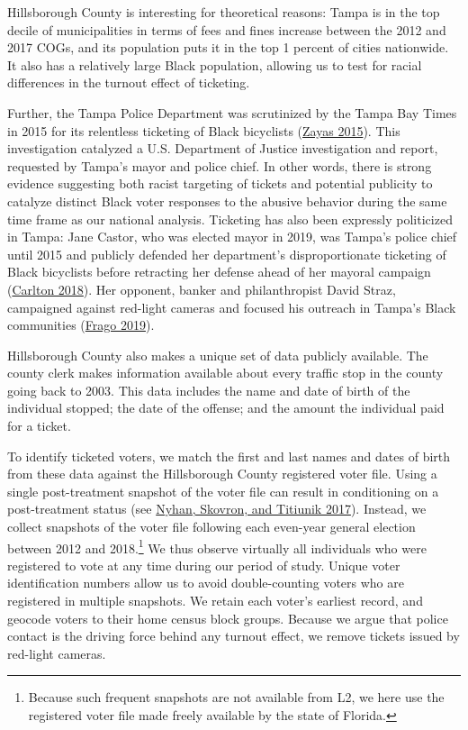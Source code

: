 \documentclass[
  12pt,
]{article}
\begin{document}
Hillsborough County is interesting for theoretical reasons: Tampa is in the top decile of municipalities in terms of fees and fines increase between the 2012 and 2017 COGs, and its population puts it in the top 1 percent of cities nationwide. It also has a relatively large Black population, allowing us to test for racial differences in the turnout effect of ticketing.

Further, the Tampa Police Department was scrutinized by the Tampa Bay Times in 2015 for its relentless ticketing of Black bicyclists (\protect\hyperlink{ref-Zayas2015}{Zayas 2015}). This investigation catalyzed a U.S. Department of Justice investigation and report, requested by Tampa's mayor and police chief. In other words, there is strong evidence suggesting both racist targeting of tickets and potential publicity to catalyze distinct Black voter responses to the abusive behavior during the same time frame as our national analysis. Ticketing has also been expressly politicized in Tampa: Jane Castor, who was elected mayor in 2019, was Tampa's police chief until 2015 and publicly defended her department's disproportionate ticketing of Black bicyclists before retracting her defense ahead of her mayoral campaign (\protect\hyperlink{ref-Carlton2018}{Carlton 2018}). Her opponent, banker and philanthropist David Straz, campaigned against red-light cameras and focused his outreach in Tampa's Black communities (\protect\hyperlink{ref-Frago2019}{Frago 2019}).

Hillsborough County also makes a unique set of data publicly available. The county clerk makes information available about every traffic stop in the county going back to 2003. This data includes the name and date of birth of the individual stopped; the date of the offense; and the amount the individual paid for a ticket.

To identify ticketed voters, we match the first and last names and dates of birth from these data against the Hillsborough County registered voter file. Using a single post-treatment snapshot of the voter file can result in conditioning on a post-treatment status (see \protect\hyperlink{ref-Nyhan2017}{Nyhan, Skovron, and Titiunik 2017}). Instead, we collect snapshots of the voter file following each even-year general election between 2012 and 2018.\footnote{Because such frequent snapshots are not available from L2, we here use the registered voter file made freely available by the state of Florida.} We thus observe virtually all individuals who were registered to vote at any time during our period of study. Unique voter identification numbers allow us to avoid double-counting voters who are registered in multiple snapshots. We retain each voter's earliest record, and geocode voters to their home census block groups. Because we argue that police contact is the driving force behind any turnout effect, we remove tickets issued by red-light cameras.
\end{document}
